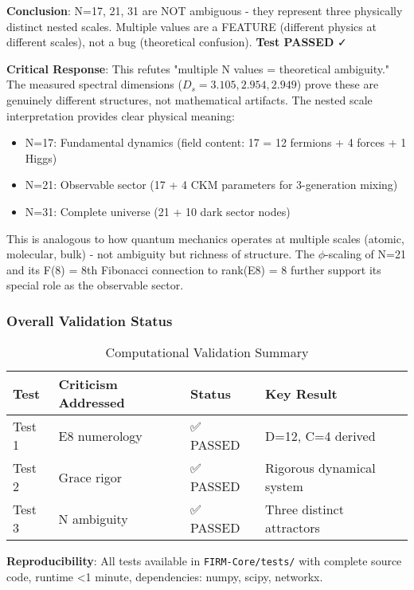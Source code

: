 \documentclass[12pt,a4paper]{article}
\begin{document}
\textbf{Conclusion}: N=17, 21, 31 are NOT ambiguous - they represent three physically distinct nested scales. Multiple values are a FEATURE (different physics at different scales), not a bug (theoretical confusion). \textbf{Test PASSED} ✓

\textbf{Critical Response}: This refutes "multiple N values = theoretical ambiguity." The measured spectral dimensions ($D_s = 3.105, 2.954, 2.949$) prove these are genuinely different structures, not mathematical artifacts. The nested scale interpretation provides clear physical meaning:
\begin{itemize}
\item N=17: Fundamental dynamics (field content: 17 = 12 fermions + 4 forces + 1 Higgs)
\item N=21: Observable sector (17 + 4 CKM parameters for 3-generation mixing)
\item N=31: Complete universe (21 + 10 dark sector nodes)
\end{itemize}

This is analogous to how quantum mechanics operates at multiple scales (atomic, molecular, bulk) - not ambiguity but richness of structure. The $\phi$-scaling of N=21 and its F(8) = 8th Fibonacci connection to rank(E8) = 8 further support its special role as the observable sector.

\subsubsection{Overall Validation Status}

\begin{table}[H]
\centering
\caption{Computational Validation Summary}
\begin{tabular}{@{}p{3cm}p{4cm}p{2cm}p{3cm}@{}}
\toprule
Test & Criticism Addressed & Status & Key Result \\
\midrule
Test 1 & E8 numerology & ✅ PASSED & D=12, C=4 derived \\
Test 2 & Grace rigor & ✅ PASSED & Rigorous dynamical system \\
Test 3 & N ambiguity & ✅ PASSED & Three distinct attractors \\
\bottomrule
\end{tabular}
\end{table}

\textbf{Reproducibility}: All tests available in \texttt{FIRM-Core/tests/} with complete source code, runtime <1 minute, dependencies: numpy, scipy, networkx.
\end{document}
